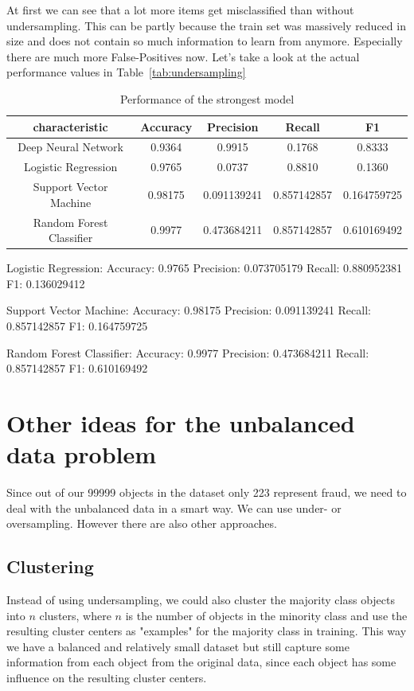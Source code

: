 \documentclass[utf8x]{ctexart}
\begin{document}
At first we can see that a lot more items get misclassified than without undersampling. This can be partly because the train set was massively reduced in size and does not contain so much information to learn from anymore. Especially there are much more False-Positives now. Let's take a look at the actual performance values in Table~\ref{tab:undersampling}



\begin{table}[ht]
  \centering
  \caption{Performance of the strongest model}
  \label{tab:chars}
  \begin{tabular}{c|cccc}
    characteristic           & Accuracy & Precision   & Recall      & F1          \\
    \hline
    Deep Neural Network      & 0.9364   & 0.9915      & 0.1768      & 0.8333      \\
    Logistic Regression      & 0.9765   & 0.0737      & 0.8810      & 0.1360      \\
    Support Vector Machine   & 0.98175  & 0.091139241 & 0.857142857 & 0.164759725 \\
    Random Forest Classifier & 0.9977   & 0.473684211 & 0.857142857 & 0.610169492 \\
  \end{tabular}
\end{table}
Logistic Regression:
Accuracy: 0.9765
Precision: 0.073705179
Recall: 0.880952381
F1: 0.136029412

Support Vector Machine:
Accuracy: 0.98175
Precision: 0.091139241
Recall: 0.857142857
F1: 0.164759725

Random Forest Classifier:
Accuracy: 0.9977
Precision: 0.473684211
Recall: 0.857142857
F1: 0.610169492








\section{Other ideas for the unbalanced data problem}

Since out of our 99999 objects in the dataset only 223 represent fraud, we need to deal with the unbalanced data in a smart way.
We can use under- or oversampling. However there are also other approaches.
\subsection{Clustering}
Instead of using undersampling, we could also cluster the majority class objects into $n$ clusters, where $n$ is the number of objects in the minority class and use the resulting cluster centers as "examples" for the majority class in training. This way we have a balanced and relatively small dataset but still capture some information from each object from the original data, since each object has some influence on the resulting cluster centers.
\end{document}
